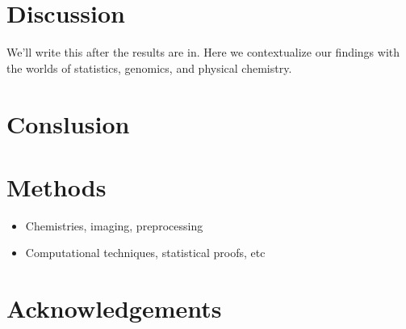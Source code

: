 \documentclass[11pt]{extarticle} %
\begin{document}
\section*{Discussion}
We’ll write this after the results are in. Here we contextualize our findings with the worlds of statistics, genomics, and physical chemistry.

\section*{Conslusion}

\section*{Methods}
\begin{itemize}
\item Chemistries, imaging, preprocessing
\item Computational techniques, statistical proofs, etc
\end{itemize}

\section*{Acknowledgements}


\newpage

%
\end{document}
